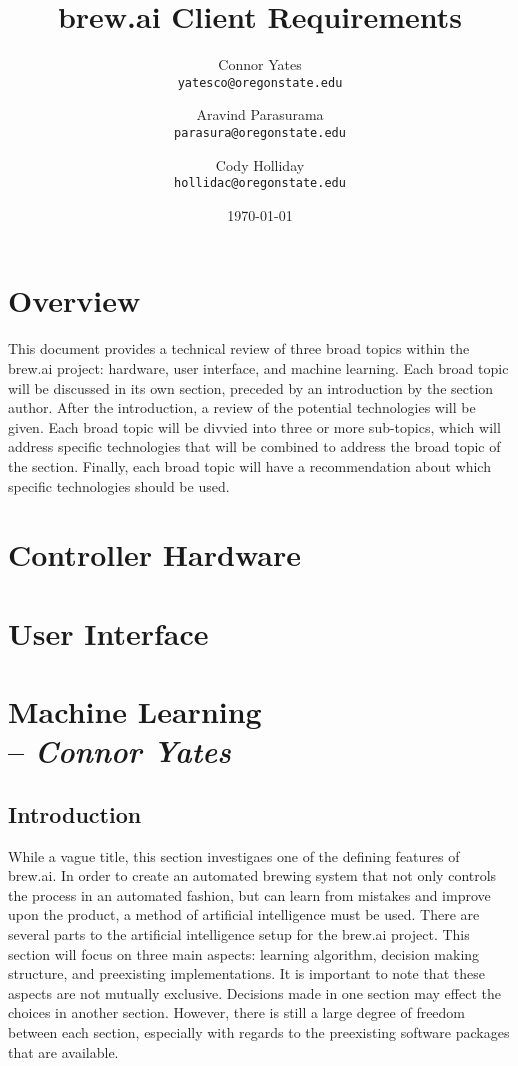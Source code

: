 \documentclass[draftclsnofoot,onecolumn,letterpaper,10pt]{IEEEtran}
\author{Connor Yates\\
\texttt{yatesco@oregonstate.edu\\}
\and
Aravind Parasurama\\
\texttt{parasura@oregonstate.edu\\}
\and
Cody Holliday\\
\texttt{hollidac@oregonstate.edu\\}}
\date{\today}
\title{brew.ai Client Requirements}
\begin{document}
\maketitle

\newpage
\tableofcontents
\newpage
\section{Overview}
This document provides a technical review of three broad topics within the brew.ai project: hardware, user interface, and machine learning.
Each broad topic will be discussed in its own section, preceded by an introduction by the section author.
After the introduction, a review of the potential technologies will be given.
Each broad topic will be divvied into three or more sub-topics, which will address specific technologies that will be combined to address the broad topic of the section.
Finally, each broad topic will have a recommendation about which specific technologies should be used.

\section{Controller Hardware}

\section{User Interface}

\section{Machine Learning \\ -- \textbf{\textit{Connor Yates}}}
\subsection{Introduction}
While a vague title, this section investigaes one of the defining features of brew.ai.
In order to create an automated brewing system that not only controls the process in an automated fashion, but can learn from mistakes and improve upon the product, a method of artificial intelligence must be used.
There are several parts to the artificial intelligence setup for the brew.ai project.
This section will focus on three main aspects: learning algorithm, decision making structure, and preexisting implementations.
It is important to note that these aspects are not mutually exclusive. 
Decisions made in one section may effect the choices in another section.
However, there is still a large degree of freedom between each section, especially with regards to the preexisting software packages that are available.
\end{document}
